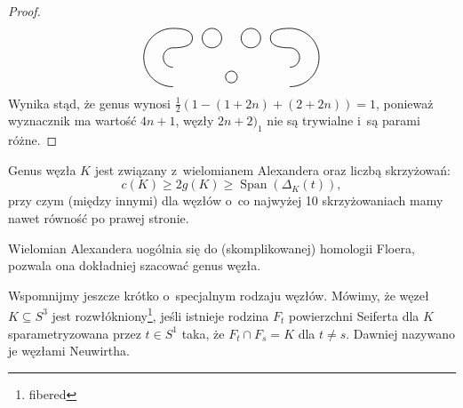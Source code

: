 \begin{proof}
\[\begin{tikzpicture}[baseline=-0.65ex,scale=0.055]
            \draw[semithick] (0,-10) circle (3);

            \draw[semithick] (-30, 15) to [out=left, in=up]   (-45, 0);
            \draw[semithick] (-30,-15) to [out=left, in=down] (-45, 0);
            \draw[semithick] (-30,  5) to [out=left, in=up]   (-35, 0);
            \draw[semithick] (-30, -5) to [out=left, in=down] (-35, 0);

            \draw[semithick] (30, 15) to [out=right, in=up]   (45,0);
            \draw[semithick] (30,-15) to [out=right, in=down] (45,0);
            \draw[semithick] (30,  5) to [out=right, in=up]   (35,0);
            \draw[semithick] (30, -5) to [out=right, in=down] (35,0);

            \draw[semithick] (-30, 15) to [out=right, in=up] (-20,10);
            \draw[semithick] (-30,  5) to [out=right, in=down] (-20,10);

            \draw[semithick] (30, 15) to [out=left, in=up] (20,10);
            \draw[semithick] (30,  5) to [out=left, in=down] (20,10);

            \draw[semithick] (-10, 10) circle (5);
            \draw[semithick] (10,  10) circle (5);
        \end{tikzpicture}
    \]
    Wynika stąd, że genus wynosi $\frac 12 (1 - (1+2n) + (2+2n)) = 1$, ponieważ wyznacznik ma wartość $4n+1$,
    węzły $2n+2)_1$ nie są trywialne i~są parami różne.
\end{proof}

\begin{proposition}
    Genus węzła $K$ jest związany z~wielomianem Alexandera oraz liczbą skrzyżowań:
    \[
        c(K) \ge 2 g(K) \ge \operatorname{Span}(\Delta_K(t)),
    \]
    przy czym (między innymi) dla węzłów o~co najwyżej 10 skrzyżowaniach mamy nawet równość po prawej stronie.
\end{proposition}

Wielomian Alexandera uogólnia się do (skomplikowanej) homologii Floera, pozwala ona dokładniej szacować genus węzła.

Wspomnijmy jeszcze krótko o~specjalnym rodzaju węzłów.
Mówimy, że węzeł $K \subseteq S^3$ jest rozwłókniony\footnote{fibered}, jeśli istnieje rodzina $F_t$ powierzchni Seiferta dla $K$ sparametryzowana przez $t \in S^1$ taka, że $F_t \cap F_s = K$ dla $t \neq s$.
Dawniej nazywano je węzłami Neuwirtha.

